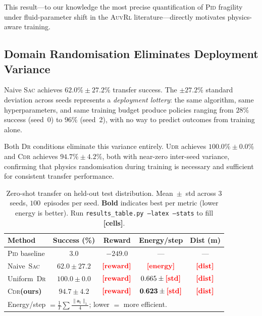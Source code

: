 \documentclass[letterpaper,10pt,journal]{IEEEtran}
\newcommand{\CDR}{\textsc{Cdr}\xspace}
\newcommand{\UDR}{\textsc{Udr}\xspace}
\newcommand{\SAC}{\textsc{Sac}\xspace}
\newcommand{\PID}{\textsc{Pid}\xspace}
\newcommand{\AUV}{\textsc{Auv}\xspace}
\newcommand{\DR}{\textsc{Dr}\xspace}
\newcommand{\RL}{\textsc{Rl}\xspace}
\newcommand{\FILL}[1]{{\color{red}\textbf{[#1]}}}
\begin{document}
This result---to our knowledge the most precise quantification of
\PID fragility under fluid-parameter shift in the \AUV \RL
literature---directly motivates physics-aware training.

\subsection{Domain Randomisation Eliminates Deployment Variance}
\label{sec:dr_result}

Naive \SAC achieves $\mathbf{62.0\%\pm27.2\%}$ transfer success.
The $\pm27.2\%$ standard deviation across seeds represents a
\emph{deployment lottery}: the same algorithm, same hyperparameters,
and same training budget produce policies ranging from $28\%$ success
(seed~0) to $96\%$ (seed~2), with no way to predict outcomes from
training alone.

Both \DR conditions eliminate this variance entirely.
\UDR achieves $\mathbf{100.0\%\pm0.0\%}$ and \CDR achieves
$\mathbf{94.7\%\pm4.2\%}$, both with near-zero inter-seed variance,
confirming that physics randomisation during training is necessary and
sufficient for consistent transfer performance.

\begin{table}[!t]
  \centering
  \caption{Zero-shot transfer on held-out test distribution.
           Mean~$\pm$~std across $3$ seeds, $100$~episodes per seed.
           \textbf{Bold} indicates best per metric (lower energy is better).
           Run \texttt{results\_table.py --latex --stats} to fill \FILL{cells}.}
  \label{tab:main_results}
  \renewcommand{\arraystretch}{1.35}
  \setlength{\tabcolsep}{4pt}
  \begin{tabular}{lcccc}
    \toprule
    \textbf{Method}
      & \textbf{Success (\%)}
      & \textbf{Reward}
      & \textbf{Energy/step}
      & \textbf{Dist (m)} \\
    \midrule
    \PID baseline
      & $3.0$
      & $-249.0$
      & ---
      & --- \\
    Naive~\SAC
      & $62.0 \pm 27.2$
      & $\FILL{reward}$
      & $\FILL{energy}$
      & $\FILL{dist}$ \\
    Uniform~\DR
      & $\mathbf{100.0 \pm 0.0}$
      & $\FILL{reward}$
      & $0.665 \pm \FILL{std}$
      & $\FILL{dist}$ \\
    \CDR \textbf{(ours)}
      & $94.7 \pm 4.2$
      & $\FILL{reward}$
      & $\mathbf{0.623 \pm \FILL{std}}$
      & $\FILL{dist}$ \\
    \bottomrule
    \multicolumn{5}{l}{\footnotesize
      Energy/step $= \frac{1}{T}\sum\frac{\|\mathbf{a}_t\|_1}{4}$; lower $=$ more efficient.}
  \end{tabular}
\end{table}
\end{document}
